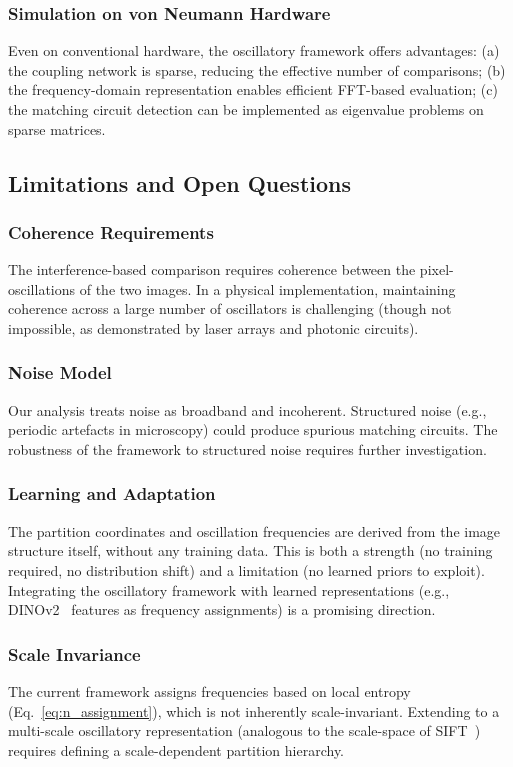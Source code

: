 \documentclass[11pt,twocolumn,a4paper]{article}
\begin{document}
\subsubsection{Simulation on von Neumann Hardware}
Even on conventional hardware, the oscillatory framework offers advantages: (a) the coupling network is sparse, reducing the effective number of comparisons; (b) the frequency-domain representation enables efficient FFT-based evaluation; (c) the matching circuit detection can be implemented as eigenvalue problems on sparse matrices.

\subsection{Limitations and Open Questions}

\subsubsection{Coherence Requirements}
The interference-based comparison requires coherence between the pixel-oscillations of the two images. In a physical implementation, maintaining coherence across a large number of oscillators is challenging (though not impossible, as demonstrated by laser arrays and photonic circuits).

\subsubsection{Noise Model}
Our analysis treats noise as broadband and incoherent. Structured noise (e.g., periodic artefacts in microscopy) could produce spurious matching circuits. The robustness of the framework to structured noise requires further investigation.

\subsubsection{Learning and Adaptation}
The partition coordinates and oscillation frequencies are derived from the image structure itself, without any training data. This is both a strength (no training required, no distribution shift) and a limitation (no learned priors to exploit). Integrating the oscillatory framework with learned representations (e.g., DINOv2~\citep{oquab2024} features as frequency assignments) is a promising direction.

\subsubsection{Scale Invariance}
The current framework assigns frequencies based on local entropy (Eq.~\eqref{eq:n_assignment}), which is not inherently scale-invariant. Extending to a multi-scale oscillatory representation (analogous to the scale-space of SIFT~\citep{lowe2004}) requires defining a scale-dependent partition hierarchy.
\end{document}
